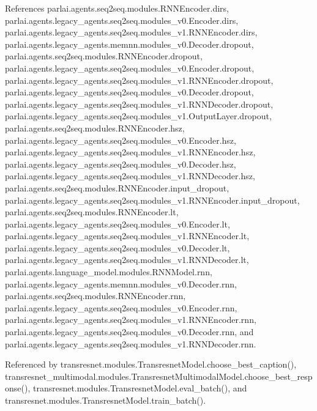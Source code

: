 References parlai.\+agents.\+seq2seq.\+modules.\+R\+N\+N\+Encoder.\+dirs, parlai.\+agents.\+legacy\+\_\+agents.\+seq2seq.\+modules\+\_\+v0.\+Encoder.\+dirs, parlai.\+agents.\+legacy\+\_\+agents.\+seq2seq.\+modules\+\_\+v1.\+R\+N\+N\+Encoder.\+dirs, parlai.\+agents.\+legacy\+\_\+agents.\+memnn.\+modules\+\_\+v0.\+Decoder.\+dropout, parlai.\+agents.\+seq2seq.\+modules.\+R\+N\+N\+Encoder.\+dropout, parlai.\+agents.\+legacy\+\_\+agents.\+seq2seq.\+modules\+\_\+v0.\+Encoder.\+dropout, parlai.\+agents.\+legacy\+\_\+agents.\+seq2seq.\+modules\+\_\+v1.\+R\+N\+N\+Encoder.\+dropout, parlai.\+agents.\+legacy\+\_\+agents.\+seq2seq.\+modules\+\_\+v0.\+Decoder.\+dropout, parlai.\+agents.\+legacy\+\_\+agents.\+seq2seq.\+modules\+\_\+v1.\+R\+N\+N\+Decoder.\+dropout, parlai.\+agents.\+legacy\+\_\+agents.\+seq2seq.\+modules\+\_\+v1.\+Output\+Layer.\+dropout, parlai.\+agents.\+seq2seq.\+modules.\+R\+N\+N\+Encoder.\+hsz, parlai.\+agents.\+legacy\+\_\+agents.\+seq2seq.\+modules\+\_\+v0.\+Encoder.\+hsz, parlai.\+agents.\+legacy\+\_\+agents.\+seq2seq.\+modules\+\_\+v1.\+R\+N\+N\+Encoder.\+hsz, parlai.\+agents.\+legacy\+\_\+agents.\+seq2seq.\+modules\+\_\+v0.\+Decoder.\+hsz, parlai.\+agents.\+legacy\+\_\+agents.\+seq2seq.\+modules\+\_\+v1.\+R\+N\+N\+Decoder.\+hsz, parlai.\+agents.\+seq2seq.\+modules.\+R\+N\+N\+Encoder.\+input\+\_\+dropout, parlai.\+agents.\+legacy\+\_\+agents.\+seq2seq.\+modules\+\_\+v1.\+R\+N\+N\+Encoder.\+input\+\_\+dropout, parlai.\+agents.\+seq2seq.\+modules.\+R\+N\+N\+Encoder.\+lt, parlai.\+agents.\+legacy\+\_\+agents.\+seq2seq.\+modules\+\_\+v0.\+Encoder.\+lt, parlai.\+agents.\+legacy\+\_\+agents.\+seq2seq.\+modules\+\_\+v1.\+R\+N\+N\+Encoder.\+lt, parlai.\+agents.\+legacy\+\_\+agents.\+seq2seq.\+modules\+\_\+v0.\+Decoder.\+lt, parlai.\+agents.\+legacy\+\_\+agents.\+seq2seq.\+modules\+\_\+v1.\+R\+N\+N\+Decoder.\+lt, parlai.\+agents.\+language\+\_\+model.\+modules.\+R\+N\+N\+Model.\+rnn, parlai.\+agents.\+legacy\+\_\+agents.\+memnn.\+modules\+\_\+v0.\+Decoder.\+rnn, parlai.\+agents.\+seq2seq.\+modules.\+R\+N\+N\+Encoder.\+rnn, parlai.\+agents.\+legacy\+\_\+agents.\+seq2seq.\+modules\+\_\+v0.\+Encoder.\+rnn, parlai.\+agents.\+legacy\+\_\+agents.\+seq2seq.\+modules\+\_\+v1.\+R\+N\+N\+Encoder.\+rnn, parlai.\+agents.\+legacy\+\_\+agents.\+seq2seq.\+modules\+\_\+v0.\+Decoder.\+rnn, and parlai.\+agents.\+legacy\+\_\+agents.\+seq2seq.\+modules\+\_\+v1.\+R\+N\+N\+Decoder.\+rnn.



Referenced by transresnet.\+modules.\+Transresnet\+Model.\+choose\+\_\+best\+\_\+caption(), transresnet\+\_\+multimodal.\+modules.\+Transresnet\+Multimodal\+Model.\+choose\+\_\+best\+\_\+response(), transresnet.\+modules.\+Transresnet\+Model.\+eval\+\_\+batch(), and transresnet.\+modules.\+Transresnet\+Model.\+train\+\_\+batch().

